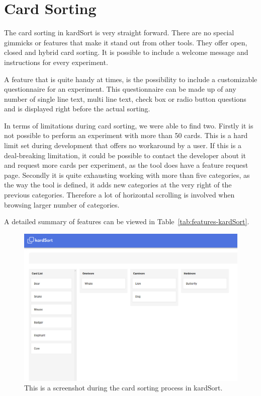 \section{Card Sorting}
The card sorting in kardSort is very straight forward. There are no 
special gimmicks or features that make it stand out from other tools.
They offer open, closed and hybrid card sorting. It is possible to
include a welcome message and instructions for every experiment.

A feature that is quite handy at times, is the possibility to include
a customizable questionnaire for an experiment. This questionnaire can
be made up of any number of single line text, multi line text,
check box or radio button questions and is displayed right before the
actual sorting.

In terms of limitations during card sorting, we were able to find two.
Firstly it is not possible to perform an experiment with more than 50
cards. This is a hard limit set during development that offers no
workaround by a user. If this is a deal-breaking limitation, it could
be possible to contact the developer about it and request more cards
per experiment, as the tool does have a feature request page.
Secondly it is quite exhausting working with more than five
categories, as the way the tool is defined, it adds new categories at
the very right of the previous categories. Therefore a lot of
horizontal scrolling is involved when browsing larger number of
categories.

A detailed summary of features can be viewed in
Table~\ref{tab:features-kardSort}.

\begin{figure}[tp] 
\centering
\includegraphics[keepaspectratio,width=\linewidth,height=\halfh]{images/kardsort-sorting.png}
\caption[kardSort Card Sorting] { This is a screenshot during the card
sorting process in kardSort.
 }
\label{fig:kardSort2}
\end{figure}


